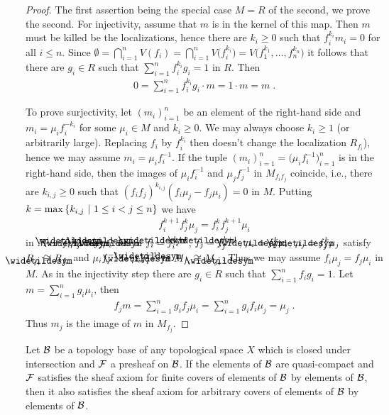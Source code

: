\documentclass[a4paper,parskip=half,numbers=enddot, DIV=12]{scrreprt}
\begin{document}
\begin{proof}
    The first assertion being the special case $M=R$ of the second, we prove the second. For injectivity, assume that $m$ is in the kernel of this map. Then $m$ must be killed be the localizations, hence there are $k_i\geq0$ such that $f^{k_i}_i m_i = 0$ for all $i\leq n$. Since $\emptyset = \bigcap_{i=1}^n V(f_i) = \bigcap_{i=1}^n V\big(f^{k_i}_i\big) = V\big(f_1^{k_1},\ldots, f_n^{k_n}\big)$ it follows that there are $g_i\in R$ such that $\sum_{i=1}^n f_i^{k_i}g_i = 1$ in $R$. Then 
    \begin{align*}
    	0=\sum_{i=1}^{n}f_i^{k_i}g_i\cdot m=1\cdot m=m\;.
    \end{align*}
    
	    To prove surjectivity, let $(m_i)_{i=1}^n$ be an element of the right-hand side and $m_i=\mu_if_i^{-k_i}$ for some $\mu_i\in M$ and $k_i\geq0$. We may always choose $k_i\geq1$ (or arbitrarily large). Replacing $f_i$ by $f_i^{k_i}$ then doesn't change the localization $R_{f_i}$), hence we may assume $m_i = \mu_if_i^{-1}$. If the tuple $(m_i)_{i=1}^n=\big(\mu_if_i^{-1}\big)_{i=1}^n$ is in the right-hand side, then the images of $\mu_if_i^{-1}$ and $\mu_jf_j^{-1}$ in $M_{f_if_j}$ coincide, i.e., there are $k_{i,j}\geq 0$ such that $(f_if_j)^{k_{i,j}}(f_i\mu_j - f_j\mu_i) = 0$ in $M$. Putting $k= \max\left\{ k_{i,j}\ \middle|\  1\leq i <j\leq n\right\}$ we have 
    \begin{align*}
        f_i^{k+1}f_j^k\mu_j = f_i^k f_j^{k+1}\mu_i
    \end{align*}
    in $M$ or $\snake f_i\snake \mu_j = \snake f_j \snake \mu_i$ where $\snake f_i = f_i^{k+1}$, $\snake f_j = f_j^{k+1}$, $\snake \mu_i = f_i^k\mu_i$, $\snake \mu_j = f_j^k\mu_j$ satisfy $R_{\snake f_i} \cong R_{f_i}$ and $\mu_if_i^{-1} = \smash{\snake \mu_i\snake f_i^{-1}}$ in $M_{f_i} \cong M_{\snake f_i}$. Thus we may assume $f_i\mu_j = f_j\mu_i$ in $M$. As in the injectivity step there are $g_i\in R$ such that $\sum_{i=1}^n f_i g_i = 1$. Let $m = \sum_{i=1}^n g_i\mu_i$, then 
    \begin{align*}
    	f_jm = \sum_{i=1}^n g_if_j\mu_i = \sum_{i=1}^n g_i f_i\mu_j = \mu_j\;. 
    \end{align*}
    Thus $m_j$ is the image of $m$ in $M_{f_j}$.
\end{proof}
\begin{lem}
    Let $\mathcal{B}$ be a topology base of any topological space $X$ which is closed under intersection and $\mathcal{F}$ a presheaf on $\mathcal{B}$. If the elements of $\mathcal{B}$ are quasi-compact and $\mathcal{F}$ satisfies the sheaf axiom for finite covers of elements of $\mathcal{B}$ by elements of $\mathcal{B}$, then it also satisfies the sheaf axiom for arbitrary covers of elements of $\mathcal{B}$ by elements of $\mathcal{B}$.
\end{lem}
\end{document}
